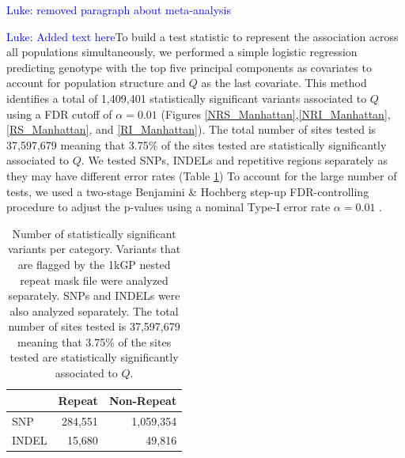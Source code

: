 \documentclass[9pt,lineno]{elife}
\newcommand{\luke}[1]{\textcolor{blue}{Luke: #1}}
\begin{document}
\luke{removed paragraph about meta-analysis}

\luke{Added text here}To build a test statistic to represent the association across all populations simultaneously, we performed a simple logistic regression predicting genotype with the top five principal components as covariates to account for population structure and $Q$ as the last covariate.
This method identifies a total of 1,409,401 statistically significant variants associated to $Q$ using a FDR cutoff of $\alpha = 0.01$ (Figures \ref{NRS_Manhattan},\ref{NRI_Manhattan}, \ref{RS_Manhattan}, and \ref{RI_Manhattan}). The total number of sites tested is 37,597,679 meaning that 3.75\% of the sites tested are statistically significantly associated to $Q$.
We tested SNPs, INDELs and repetitive regions separately as they may have different error rates (Table \ref{sigTable})
To account for the large number of tests, we used a two-stage Benjamini \& Hochberg step-up FDR-controlling procedure to adjust the p-values using a nominal Type-I error rate $\alpha = 0.01$ \citep{Benjamini2006}. 

\begin{table}[h]
\begin{tabular}{l  r r}
                      & {Repeat}  & {Non-Repeat}       \\ \hline
{SNP}  & 284,551 & 1,059,354 \\  
{INDEL} & 15,680 & 49,816 \\ \hline
\end{tabular}
\caption{Number of statistically significant variants per category. Variants that are flagged by the 1kGP nested repeat mask file were analyzed separately. SNPs and INDELs were also analyzed separately. The total number of sites tested is 37,597,679 meaning that 3.75\% of the sites tested are statistically significantly associated to $Q$.}
\label{sigTable}
\end{table}
\end{document}

